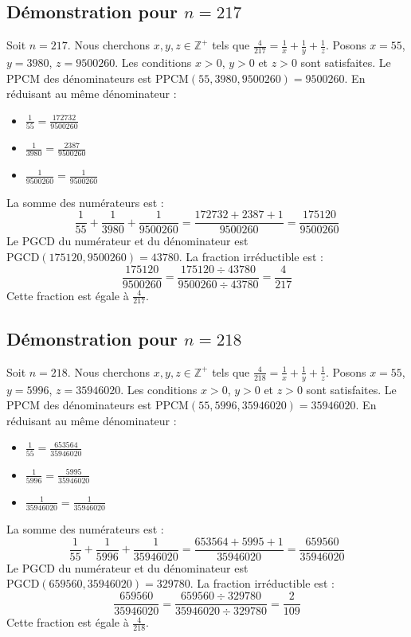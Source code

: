 \documentclass[11pt,a4paper]{article}
\begin{document}
\subsection{Démonstration pour $n = 217$}
Soit $n = 217$. Nous cherchons $x, y, z \in \mathbb{Z}^{+}$ tels que $\frac{4}{217} = \frac{1}{x} + \frac{1}{y} + \frac{1}{z}$.
Posons $x = 55$, $y = 3980$, $z = 9500260$.
Les conditions $x > 0$, $y > 0$ et $z > 0$ sont satisfaites.
Le PPCM des dénominateurs est $\text{PPCM}(55, 3980, 9500260) = 9500260$.
En réduisant au même dénominateur :
\begin{itemize}
    \item $\frac{1}{55} = \frac{172732}{9500260}$
    \item $\frac{1}{3980} = \frac{2387}{9500260}$
    \item $\frac{1}{9500260} = \frac{1}{9500260}$
\end{itemize}
La somme des numérateurs est :
$$ \frac{1}{55} + \frac{1}{3980} + \frac{1}{9500260} = \frac{172732 + 2387 + 1}{9500260} = \frac{175120}{9500260} $$
Le PGCD du numérateur et du dénominateur est $\text{PGCD}(175120, 9500260) = 43780$.
La fraction irréductible est :
$$ \frac{175120}{9500260} = \frac{175120 \div 43780}{9500260 \div 43780} = \frac{4}{217} $$
Cette fraction est égale à $\frac{4}{217}$.

\subsection{Démonstration pour $n = 218$}
Soit $n = 218$. Nous cherchons $x, y, z \in \mathbb{Z}^{+}$ tels que $\frac{4}{218} = \frac{1}{x} + \frac{1}{y} + \frac{1}{z}$.
Posons $x = 55$, $y = 5996$, $z = 35946020$.
Les conditions $x > 0$, $y > 0$ et $z > 0$ sont satisfaites.
Le PPCM des dénominateurs est $\text{PPCM}(55, 5996, 35946020) = 35946020$.
En réduisant au même dénominateur :
\begin{itemize}
    \item $\frac{1}{55} = \frac{653564}{35946020}$
    \item $\frac{1}{5996} = \frac{5995}{35946020}$
    \item $\frac{1}{35946020} = \frac{1}{35946020}$
\end{itemize}
La somme des numérateurs est :
$$ \frac{1}{55} + \frac{1}{5996} + \frac{1}{35946020} = \frac{653564 + 5995 + 1}{35946020} = \frac{659560}{35946020} $$
Le PGCD du numérateur et du dénominateur est $\text{PGCD}(659560, 35946020) = 329780$.
La fraction irréductible est :
$$ \frac{659560}{35946020} = \frac{659560 \div 329780}{35946020 \div 329780} = \frac{2}{109} $$
Cette fraction est égale à $\frac{4}{218}$.
\end{document}
